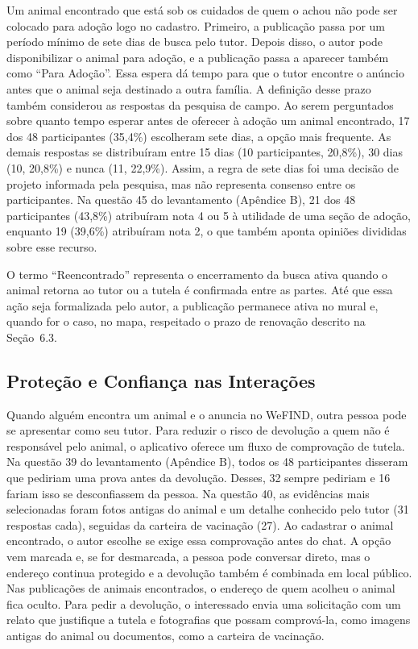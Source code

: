 Um animal encontrado que está sob os cuidados de quem o achou não pode ser colocado para adoção logo no cadastro. Primeiro, a publicação passa por um período mínimo de sete dias de busca pelo tutor. Depois disso, o autor pode disponibilizar o animal para adoção, e a publicação passa a aparecer também como ``Para Adoção''. Essa espera dá tempo para que o tutor encontre o anúncio antes que o animal seja destinado a outra família. A definição desse prazo também considerou as respostas da pesquisa de campo. Ao serem perguntados sobre quanto tempo esperar antes de oferecer à adoção um animal encontrado, 17 dos 48 participantes (35,4\%) escolheram sete dias, a opção mais frequente. As demais respostas se distribuíram entre 15 dias (10 participantes, 20,8\%), 30 dias (10, 20,8\%) e nunca (11, 22,9\%). Assim, a regra de sete dias foi uma decisão de projeto informada pela pesquisa, mas não representa consenso entre os participantes. Na questão 45 do levantamento (Apêndice B), 21 dos 48 participantes (43,8\%) atribuíram nota 4 ou 5 à utilidade de uma seção de adoção, enquanto 19 (39,6\%) atribuíram nota 2, o que também aponta opiniões divididas sobre esse recurso.

O termo ``Reencontrado'' representa o encerramento da busca ativa quando o animal retorna ao tutor ou a tutela é confirmada entre as partes. Até que essa ação seja formalizada pelo autor, a publicação permanece ativa no mural e, quando for o caso, no mapa, respeitado o prazo de renovação descrito na Seção~6.3.

\subsection{Proteção e Confiança nas Interações}\label{sec:tutela}\label{sec:privacidade}\label{sec:classificacao}

Quando alguém encontra um animal e o anuncia no WeFIND, outra pessoa pode se apresentar como seu tutor. Para reduzir o risco de devolução a quem não é responsável pelo animal, o aplicativo oferece um fluxo de comprovação de tutela. Na questão 39 do levantamento (Apêndice B), todos os 48 participantes disseram que pediriam uma prova antes da devolução. Desses, 32 sempre pediriam e 16 fariam isso se desconfiassem da pessoa. Na questão 40, as evidências mais selecionadas foram fotos antigas do animal e um detalhe conhecido pelo tutor (31 respostas cada), seguidas da carteira de vacinação (27). Ao cadastrar o animal encontrado, o autor escolhe se exige essa comprovação antes do chat. A opção vem marcada e, se for desmarcada, a pessoa pode conversar direto, mas o endereço continua protegido e a devolução também é combinada em local público. Nas publicações de animais encontrados, o endereço de quem acolheu o animal fica oculto. Para pedir a devolução, o interessado envia uma solicitação com um relato que justifique a tutela e fotografias que possam comprová-la, como imagens antigas do animal ou documentos, como a carteira de vacinação.

